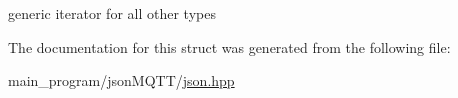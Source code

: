 generic iterator for all other types 



The documentation for this struct was generated from the following file\+:\begin{DoxyCompactItemize}
\item 
main\+\_\+program/json\+M\+Q\+T\+T/\hyperlink{json_8hpp}{json.\+hpp}\end{DoxyCompactItemize}
